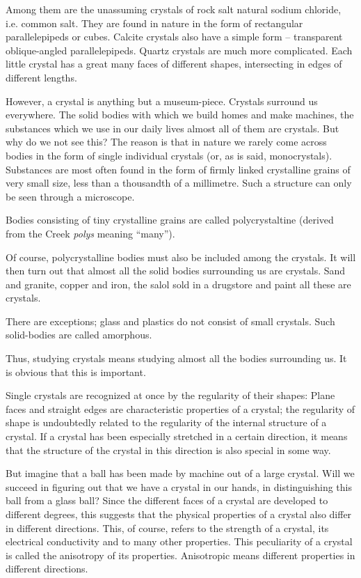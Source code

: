 Among them are the unassuming crystals of rock salt natural sodium chloride, i.e. common salt. They are found in nature in the form of rectangular parallelepipeds or cubes. Calcite crystals also have a simple form -- trans­parent oblique-angled parallelepipeds. Quartz crystals are much more complicated. Each little crystal has a great many faces of different shapes, intersecting in edges of different lengths.

However, a crystal is anything but a museum-piece. Crystals surround us everywhere. The solid bodies with which we build homes and make machines, the substances which we use in our daily lives almost all of them are crystals. But why do we not see this? The reason is that in nature we rarely come across bodies in the form of single individual crystals (or, as is said, monocrystals). Substances are most often found in the form of firmly linked crystalline grains of very small size, less than a thousandth of a millimetre. Such a structure can only be seen through a microscope.

Bodies consisting of tiny crystalline grains are called polycrystaltine (derived from the Creek \emph{polys} meaning ``many'').

Of course, polycrystalline  bodies must also be included among the crystals. It will then turn out that almost all the solid bodies surrounding us are crystals. Sand and granite, copper and iron, the salol sold in a drugstore and paint all these are crystals.

There are exceptions; glass and plastics do not con­sist of small crystals. Such solid-bodies are called amorphous.

Thus, studying crystals means studying almost all the bodies surrounding us. It is obvious that this is important. 

Single crystals are recognized at once by the regularity of their shapes: Plane faces and straight edges are char­acteristic properties of a crystal; the regularity of shape is undoubtedly related to the regularity of the internal structure of a crystal. If a crystal has been especially stretched in a certain direction, it means that the struc­ture of the crystal in this direction is also special in some way.

But imagine that a ball has been made by machine out of a large crystal. Will we succeed in figuring out that we have a crystal in our hands, in distinguishing this ball from a glass ball? Since the different faces of a crystal are developed to different degrees, this suggests that the physical properties of a crystal also differ in different directions. This, of course, refers to the strength of a crystal, its electrical conductivity and to many other properties. This peculiarity of a crystal is called the anisotropy of its properties. Anisotropic means different properties in different directions.

